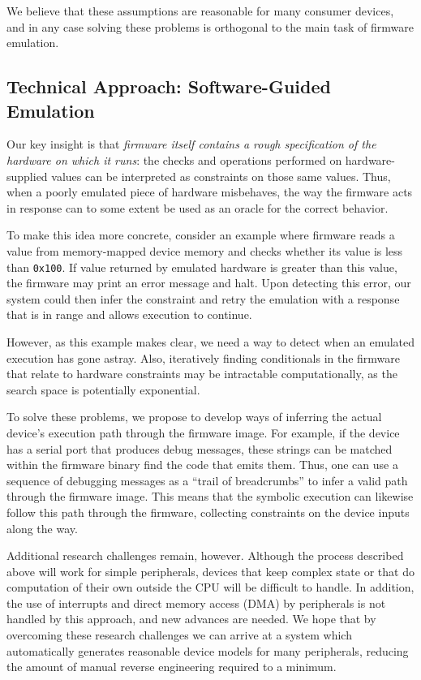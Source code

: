 We believe that these assumptions are reasonable for many consumer
devices, and in any case solving these problems is orthogonal to the
main task of firmware emulation.

\subsection{Technical Approach: Software-Guided Emulation}

Our key insight is that \emph{firmware itself contains a rough
specification of the hardware on which it runs}: the checks and
operations performed on hardware-supplied values can be interpreted as
constraints on those same values. Thus, when a poorly emulated piece of
hardware misbehaves, the way the firmware acts in response can to
some extent be used as an oracle for the correct behavior.

To make this idea more concrete, consider an example where firmware
reads a value from memory-mapped device memory and checks whether its
value is less than \texttt{0x100}. If value returned by emulated
hardware is greater than this value, the firmware may print an error
message and halt. Upon detecting this error, our system could then infer
the constraint and retry the emulation with a response that is in range
and allows execution to continue.

However, as this example makes clear, we need a way to detect when an
emulated execution has gone astray. Also, iteratively finding
conditionals in the firmware that relate to hardware constraints may be
intractable computationally, as the search space is potentially
exponential.

To solve these problems, we propose to develop ways of inferring the
actual device's execution path through the firmware image. For example,
if the device has a serial port that produces debug messages, these
strings can be matched within the firmware binary find the code that
emits them. Thus, one can use a sequence of debugging messages as a
``trail of breadcrumbs'' to infer a valid path through the firmware
image. This means that the symbolic execution can likewise follow this
path through the firmware, collecting constraints on the device inputs
along the way.

Additional research challenges remain, however. Although the process
described above will work for simple peripherals, devices that keep
complex state or that do computation of their own outside the CPU will
be difficult to handle. In addition, the use of interrupts and direct
memory access (DMA) by peripherals is not handled by this approach, and
new advances are needed. We hope that by overcoming these research
challenges we can arrive at a system which automatically generates
reasonable device models for many peripherals, reducing the amount of
manual reverse engineering required to a minimum.

